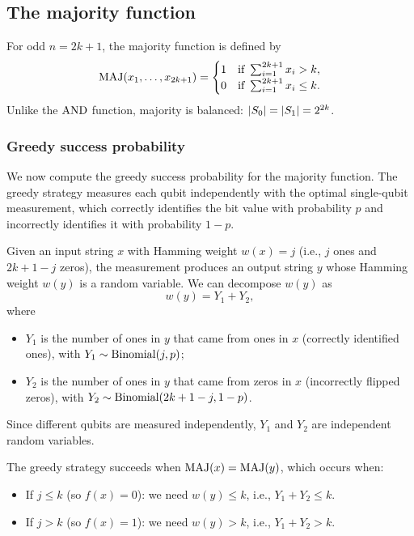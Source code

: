 
\subsection{The majority function}

For odd $n = 2k+1$, the majority function is defined by
\begin{equation}
    \mathrm{MAJ}(x_1,\ldots,x_{2k+1}) = \begin{cases}
        1 & \text{if } \sum_{i=1}^{2k+1} x_i > k, \\
        0 & \text{if } \sum_{i=1}^{2k+1} x_i \leq k.
    \end{cases}
\end{equation}
Unlike the $\mathrm{AND}$ function, majority is balanced: $\abs{S_0} = \abs{S_1} = 2^{2k}$.

\subsubsection{Greedy success probability}

We now compute the greedy success probability for the majority function.
The greedy strategy measures each qubit independently with the optimal single-qubit measurement, which correctly identifies the bit value with probability $p$ and incorrectly identifies it with probability $1-p$.

Given an input string $x$ with Hamming weight $w(x) = j$ (i.e., $j$ ones and $2k+1-j$ zeros), the measurement produces an output string $y$ whose Hamming weight $w(y)$ is a random variable.
We can decompose $w(y)$ as
\begin{equation}
    w(y) = Y_1 + Y_2,
\end{equation}
where
\begin{itemize}
    \item $Y_1$ is the number of ones in $y$ that came from ones in $x$ (correctly identified ones), with $Y_1 \sim \operatorname{Binomial}(j, p)$;
    \item $Y_2$ is the number of ones in $y$ that came from zeros in $x$ (incorrectly flipped zeros), with $Y_2 \sim \operatorname{Binomial}(2k+1-j, 1-p)$.
\end{itemize}

Since different qubits are measured independently, $Y_1$ and $Y_2$ are independent random variables.

The greedy strategy succeeds when $\mathrm{MAJ}(x) = \mathrm{MAJ}(y)$, which occurs when:
\begin{itemize}
    \item If $j \leq k$ (so $f(x) = 0$): we need $w(y) \leq k$, i.e., $Y_1 + Y_2 \leq k$.
    \item If $j > k$ (so $f(x) = 1$): we need $w(y) > k$, i.e., $Y_1 + Y_2 > k$.
\end{itemize}

